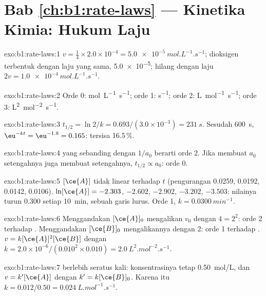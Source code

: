 \section*{Bab \ref{ch:b1:rate-laws} --- Kinetika Kimia: Hukum Laju}

\begin{solution}{exo:b1:rate-laws:1}
$v = \frac14 \times 2.0 \times 10^{-4} = \qty{5.0e-5}{mol.L^{-1}.s^{-1}}$;
dioksigen terbentuk dengan laju yang sama, \qty{5.0e-5}{};  hilang
dengan laju $2v = \qty{1.0e-4}{mol.L^{-1}.s^{-1}}$.
\end{solution}

\begin{solution}{exo:b1:rate-laws:2}
Orde 0: \unit{mol.L^{-1}.s^{-1}}; orde 1: \unit{s^{-1}}; orde 2:
\unit{L.mol^{-1}.s^{-1}}; orde 3: \unit{L^2.mol^{-2}.s^{-1}}.
\end{solution}

\begin{solution}{exo:b1:rate-laws:3}
$t_{1/2} = \ln2/k = 0.693/(3.0 \times 10^{-3}) = \qty{231}{s}$. Sesudah
\qty{600}{s}, $\eu^{-kt} = \eu^{-1.8} = 0.165$: tersisa 16.5\,\%.
\end{solution}

\begin{solution}{exo:b1:rate-laws:4}
 yang sebanding dengan $1/a_0$ berarti orde 2. Jika membuat
$a_0$ setengahnya juga membuat  setengahnya,
$t_{1/2} \propto a_0$: orde 0.
\end{solution}

\begin{solution}{exo:b1:rate-laws:5}
$[\ce{A}]$ tidak linear terhadap $t$ (pengurangan 0.0259, 0.0192, 0.0142,
0.0106). $\ln[\ce{A}] = -2.303$, $-2.602$, $-2.902$, $-3.202$, $-3.503$:
nilainya turun 0.300 setiap \qty{10}{min}, sebuah garis lurus. Orde 1,
$k =
\qty{0.0300}{min^{-1}}$.
\end{solution}

\begin{solution}{exo:b1:rate-laws:6}
Menggandakan $[\ce{A}]_0$ mengalikan $v_0$ dengan $4 = 2^2$: orde 2
terhadap . Menggandakan $[\ce{B}]_0$ mengalikannya dengan 2: orde 1
terhadap . $v =
k[\ce{A}]^2[\ce{B}]$ dengan $k = 2.0 \times 10^{-6}/(0.010^2 \times 0.010) =
\qty{2.0}{L^2.mol^{-2}.s^{-1}}$.
\end{solution}

\begin{solution}{exo:b1:rate-laws:7}
 berlebih seratus kali: konsentrasinya tetap \qty{0.50}{mol/L}, dan
$v = k'[\ce{A}]$ dengan $k' = k[\ce{B}]_0$. Karena itu
$k = 0.012/0.50 = \qty{0.024}{L.mol^{-1}.s^{-1}}$.
\end{solution}

